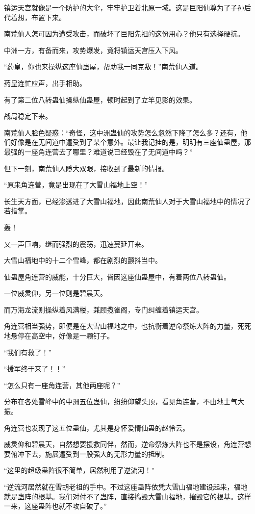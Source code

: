 \begin{this_body}
镇运天宫就像是一个防护的大伞，牢牢护卫着北原一域。这是巨阳仙尊为了子孙后代着想，布置下来。

南荒仙人怎可因为遭受攻击，而破坏了巨阳先祖的这份用心？他只有选择硬抗。

中洲一方，有备而来，攻势爆发，竟将镇运天宫压入下风。

“药皇，你也来操纵这座仙蛊屋，帮助我一同克敌！”南荒仙人道。

药皇连忙应声，出手相助。

有了第二位八转蛊仙操纵仙蛊屋，顿时起到了立竿见影的效果。

战局稳定下来。

南荒仙人脸色疑惑：“奇怪，这中洲蛊仙的攻势怎么忽然下降了怎么多？还有，他们好像是在无间道中遭受到了某个意外。最让我记挂的是，明明有三座仙蛊屋，那最强的一座角连营去了哪里？难道说已经毁在了无间道中吗？”

但下一刻，南荒仙人瞪大双眼，接收到了最新的情报。

“原来角连营，竟是出现在了大雪山福地上空！”

长生天方面，已经渗透进了大雪山福地，因此南荒仙人对于大雪山福地中的情况了若指掌。

轰！

又一声巨响，继而强烈的震荡，迅速蔓延开来。

大雪山福地中的十二个雪峰，都在剧烈的颤抖当中。

仙蛊屋角连营的威能，十分巨大，皆因这座仙蛊屋中，有着两位八转蛊仙。

一位威灵仰，另一位则是碧晨天。

而万海龙流则操纵着风满楼，兼顾揽雀阁，专门纠缠着镇运天宫。

角连营相当强势，即便是在大雪山福地之中，也抗衡着逆命祭炼大阵的力量，死死地悬停在高空中，好像是一颗钉子。

“我们有救了！”

“援军终于来了！！”

“怎么只有一座角连营，其他两座呢？”

分布在各处雪峰中的中洲五位蛊仙，纷纷仰望头顶，看见角连营，不由地士气大振。

角连营也发现了这五位蛊仙，尤其是身怀爱情仙蛊的赵怜云。

威灵仰和碧晨天，自然想要援救同伴，然而，逆命祭炼大阵也不是摆设，角连营想要俯冲下去，施展遭受到一股强大的无形力量的抵制。

“这里的超级蛊阵很不简单，居然利用了逆流河！”

“逆流河居然就在雪胡老祖的手中。不过这座蛊阵依凭大雪山福地建设起来，福地就是蛊阵的根基。我们对付不了蛊阵，直接捣毁大雪山福地，摧毁它的根基。这样一来，这座蛊阵也就不攻自破了。”


\end{this_body}

